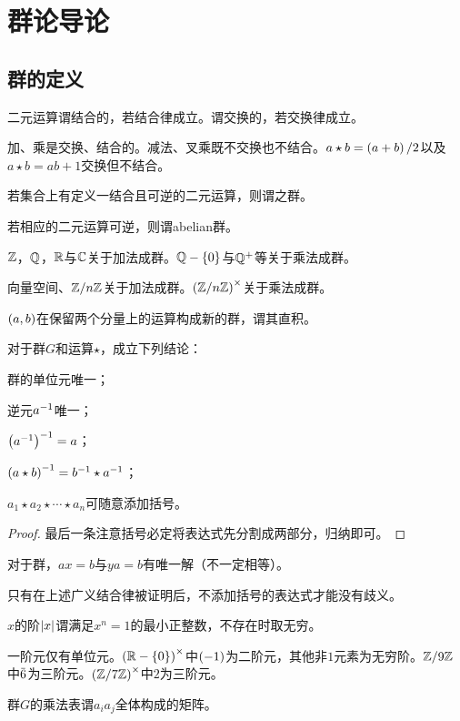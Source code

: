 \documentclass{ctexrep}
\begin{document}
\section{群论导论}
\subsection{群的定义}
\begin{definition}
二元运算谓结合的，若结合律成立。谓交换的，若交换律成立。
\end{definition}
\begin{ex}
加、乘是交换、结合的。减法、叉乘既不交换也不结合。$a\star b = \left(a+b\right)/2$以及$a\star b=ab+1$交换但不结合。
\end{ex}
\begin{definition}
若集合上有定义一结合且可逆的二元运算，则谓之群。
\end{definition}
\begin{definition}
若相应的二元运算可逆，则谓abelian群。
\end{definition}
\begin{ex}
$\mathbb{Z}$，$\mathbb{Q}$，$\mathbb{R}$与$\mathbb{C}$关于加法成群。$\mathbb{Q}-\left\{0\right\}$与$\mathbb{Q}^+$等关于乘法成群。
\end{ex}
\begin{ex}
向量空间、$\mathbb{Z}/n\mathbb{Z}$关于加法成群。$\left(\mathbb{Z}/n\mathbb{Z}\right)^\times$关于乘法成群。
\end{ex}
\begin{definition}
$\left(a,b\right)$在保留两个分量上的运算构成新的群，谓其直积。
\end{definition}
\begin{proposition}
对于群$G$和运算$\star$，成立下列结论：
\begin{cenum}
\item 群的单位元唯一；
\item 逆元$a^{-1}$唯一；
\item $\left(a^{-1}\right)^{-1}=a$；
\item $\left(a\star b\right)^{-1} = b^{-1}\star a^{-1}$；
\item $a_1 \star a_2 \star \cdots \star a_n$可随意添加括号。
\end{cenum}
\end{proposition}
\begin{proof}
最后一条注意括号必定将表达式先分割成两部分，归纳即可。
\end{proof}
\begin{proposition}
对于群，$ax=b$与$ya=b$有唯一解（不一定相等）。
\end{proposition}
只有在上述广义结合律被证明后，不添加括号的表达式才能没有歧义。
\begin{definition}
$x$的阶$\abs{x}$谓满足$x^n=1$的最小正整数，不存在时取无穷。
\end{definition}
\begin{ex}
一阶元仅有单位元。$\left(\mathbb{R}-\left\{0\right\}\right)^\times$中$\left(-1\right)$为二阶元，其他非$1$元素为无穷阶。$\mathbb{Z}/9\mathbb{Z}$中$\modeq{6}$为三阶元。$\left(\mathbb{Z}/7\mathbb{Z}\right)^\times$中$2$为三阶元。
\end{ex}
\begin{definition}
群$G$的乘法表谓$a_i a_j$全体构成的矩阵。
\end{definition}
\end{document}
